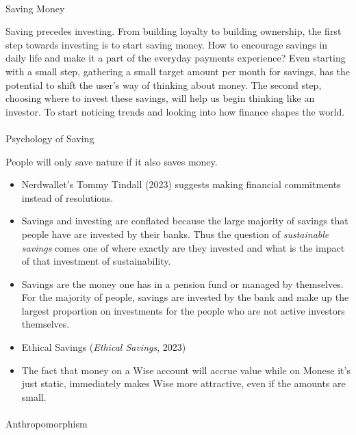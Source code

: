 \documentclass[
  letterpaper,
  DIV=11,
  numbers=noendperiod]{scrartcl}
\makeatletter
\let\oldparagraph\paragraph
\renewcommand{\paragraph}{
    \@ifstar
      \xxxParagraphStar
      \xxxParagraphNoStar
  }
\newcommand{\xxxParagraphStar}[1]{\oldparagraph*{#1}\mbox{}}
\newcommand{\xxxParagraphNoStar}[1]{\oldparagraph{#1}\mbox{}}
\makeatother
\begin{document}
\paragraph{Saving Money}\label{saving-money}

Saving precedes investing. From building loyalty to building ownership,
the first step towards investing is to start saving money. How to
encourage savings in daily life and make it a part of the everyday
payments experience? Even starting with a small step, gathering a small
target amount per month for savings, has the potential to shift the
user's way of thinking about money. The second step, choosing where to
invest these savings, will help us begin thinking like an investor. To
start noticing trends and looking into how finance shapes the world.

\paragraph{Psychology of Saving}\label{psychology-of-saving}

People will only save nature if it also saves money.

\begin{itemize}
\item
  Nerdwallet's Tommy Tindall (2023) suggests making financial
  commitments instead of resolutions.
\item
  Savings and investing are conflated because the large majority of
  savings that people have are invested by their banks. Thus the
  question of \emph{sustainable savings} comes one of where exactly are
  they invested and what is the impact of that investment of
  sustainability.
\item
  Savings are the money one has in a pension fund or managed by
  themselves. For the majority of people, savings are invested by the
  bank and make up the largest proportion on investments for the people
  who are not active investors themselves.
\item
  Ethical Savings (\emph{Ethical {Savings}}, 2023)
\item
  The fact that money on a Wise account will accrue value while on
  Monese it's just static, immediately makes Wise more attractive, even
  if the amounts are small.
\end{itemize}

\paragraph{Anthropomorphism}\label{anthropomorphism}
\end{document}
